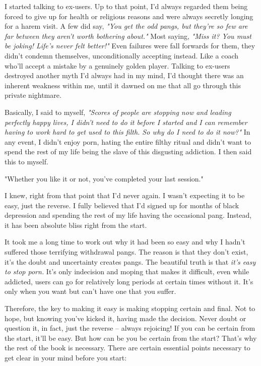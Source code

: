 \documentclass[easypeasy]{subfiles}
\begin{document}
I started talking to ex-users. Up to that point, I'd always regarded them being forced to give up for health or religious reasons and were always secretly longing for a harem visit. A few did say, \textit{"You get the odd pangs, but they're so few are far between they aren't worth bothering about."} Most saying, \textit{"Miss it? You must be joking! Life's never felt better!"} Even failures were fall forwards for them, they didn't condemn themselves, unconditionally accepting instead. Like a coach who'll accept a mistake by a genuinely golden player. Talking to ex-users destroyed another myth I'd always had in my mind, I'd thought there was an inherent weakness within me, until it dawned on me that all go through this private nightmare.

Basically, I said to myself, \textit{"Scores of people are stopping now and leading perfectly happy lives, I didn't need to do it before I started and I can remember having to work hard to get used to this filth. So why do I need to do it now?"} In any event, I didn't enjoy porn, hating the entire filthy ritual and didn't want to spend the rest of my life being the slave of this disgusting addiction. I then said this to myself.

  {\Large "Whether you like it or not, you've completed your last session."}

I knew, right from that point that I'd never again. I wasn't expecting it to be easy, just the reverse. I fully believed that I'd signed up for months of black depression and spending the rest of my life having the occasional pang. Instead, it has been absolute bliss right from the start.

It took me a long time to work out why it had been so easy and why I hadn't suffered those terrifying withdrawal pangs. The reason is that they don't exist, it's the doubt and uncertainty creates pangs. The beautiful truth is that \textit{it's easy to stop porn.} It's only indecision and moping that makes it difficult, even while addicted, users can go for relatively long periods at certain times without it. It's only when you want but can't have one that you suffer.

Therefore, the key to making it easy is making stopping certain and final. Not to hope, but knowing you've kicked it, having made the decision. Never doubt or question it, in fact, just the reverse -- always rejoicing! If you can be certain from the start, it'll be easy. But how can be you be certain from the start? That's why the rest of the book is necessary. There are certain essential points necessary to get clear in your mind before you start:
\end{document}
